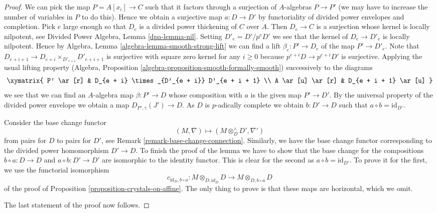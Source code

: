 \begin{proof}
We can pick the map $P = A[x_i] \to C$ such that it factors through
a surjection of $A$-algebras $P \to P'$ (we may have to increase the
number of variables in $P$ to do this). Hence we obtain a surjective
map $a : D \to D'$ by functoriality of divided power envelopes and
completion. Pick $e$ large enough so that $D_e$ is a divided power
thickening of $C$ over $A$. Then $D_e \to C$ is a surjection whose kernel
is locally nilpotent, see Divided Power Algebra, Lemma \ref{dpa-lemma-nil}.
Setting $D'_e = D'/p^eD'$
we see that the kernel of $D_e \to D'_e$ is locally nilpotent.
Hence by Algebra, Lemma \ref{algebra-lemma-smooth-strong-lift}
we can find a lift $\beta_e : P' \to D_e$ of the map $P' \to D'_e$.
Note that $D_{e + i + 1} \to D_{e + i} \times_{D'_{e + i}} D'_{e + i + 1}$
is surjective with square zero kernel for any $i \geq 0$ because
$p^{e + i}D \to p^{e + i}D'$ is surjective. Applying the usual lifting
property (Algebra, Proposition \ref{algebra-proposition-smooth-formally-smooth})
successively to the diagrams
$$
\xymatrix{
P' \ar[r] & D_{e + i} \times_{D'_{e + i}} D'_{e + i + 1} \\
A \ar[u] \ar[r] & D_{e + i + 1} \ar[u]
}
$$
we see that we can find an $A$-algebra map $\beta : P' \to D$ whose
composition with $a$ is the given map $P' \to D'$.
By the universal property of the divided power envelope we obtain a
map $D_{P', \gamma}(J') \to D$. As $D$ is $p$-adically complete we
obtain $b : D' \to D$ such that $a \circ b = \text{id}_{D'}$.

\medskip\noindent
Consider the base change functor
$$
(M, \nabla) \longmapsto
(M \otimes^\wedge_D D', \nabla')
$$
from pairs for $D$ to pairs for $D'$, see
Remark \ref{remark-base-change-connection}.
Similarly, we have the base change functor corresponding to the divided
power homomorphism $D' \to D$. To finish the proof of the lemma we have
to show that the base change for the compositions $b \circ a : D \to D$
and $a \circ b : D' \to D'$ are isomorphic to the identity functor.
This is clear for the second as $a \circ b = \text{id}_{D'}$.
To prove it for the first, we use the functorial isomorphism
$$
c_{\text{id}_D, b \circ a} :
M \otimes_{D, \text{id}_D} D
\longrightarrow
M \otimes_{D, b \circ a} D
$$
of the proof of Proposition \ref{proposition-crystals-on-affine}.
The only thing to prove is that these maps are horizontal, which we omit.

\medskip\noindent
The last statement of the proof now follows.
\end{proof}

